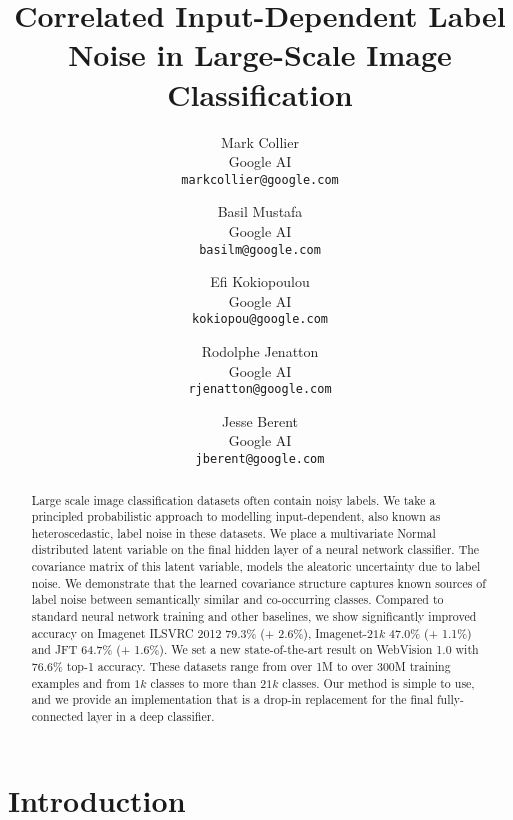 \documentclass[final]{cvpr}
\begin{document}
\title{Correlated Input-Dependent Label Noise in Large-Scale Image Classification}

\author{Mark Collier\\
Google AI\\
{\tt\small markcollier@google.com}
\and
Basil Mustafa\\
Google AI\\
{\tt\small basilm@google.com}
\and
Efi Kokiopoulou\\
Google AI\\
{\tt\small kokiopou@google.com}
\and
Rodolphe Jenatton\\
Google AI\\
{\tt\small rjenatton@google.com}
\and
Jesse Berent\\
Google AI\\
{\tt\small jberent@google.com}
}

\maketitle


\begin{abstract}
   Large scale image classification datasets often contain noisy labels. We take a principled probabilistic approach to modelling input-dependent, also known as heteroscedastic, label noise in these datasets. We place a multivariate Normal distributed latent variable on the final hidden layer of a neural network classifier. The covariance matrix of this latent variable, models the aleatoric uncertainty due to label noise. We demonstrate that the learned covariance structure captures known sources of label noise between semantically similar and co-occurring classes. Compared to standard neural network training and other baselines, we show significantly improved accuracy on Imagenet ILSVRC 2012 79.3\% (+ 2.6\%), Imagenet-$21k$ 47.0\% (+ 1.1\%) and JFT 64.7\% (+ 1.6\%). We set a new state-of-the-art result on WebVision 1.0 with 76.6\% top-1 accuracy. These datasets range from over 1M to over 300M training examples and from $1k$ classes to more than $21k$ classes. Our method is simple to use, and we provide an implementation that is a drop-in replacement for the final fully-connected layer in a deep classifier.
\end{abstract}

\FloatBarrier

\section{Introduction}
\end{document}
